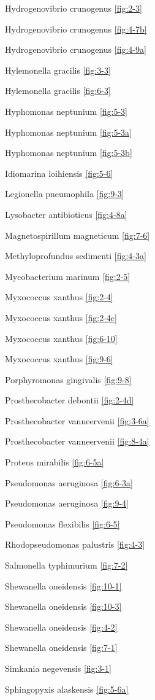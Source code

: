 \documentclass[]{tufte-book}
\begin{document}
Hydrogenovibrio crunogenus \ref{fig:2-3}

Hydrogenovibrio crunogenus \ref{fig:4-7b}

Hydrogenovibrio crunogenus \ref{fig:4-9a}

Hylemonella gracilis \ref{fig:3-3}

Hylemonella gracilis \ref{fig:6-3}

Hyphomonas neptunium \ref{fig:5-3}

Hyphomonas neptunium \ref{fig:5-3a}

Hyphomonas neptunium \ref{fig:5-3b}

Idiomarina loihiensis \ref{fig:5-6}

Legionella pneumophila \ref{fig:9-3}

Lysobacter antibioticus \ref{fig:4-8a}

Magnetospirillum magneticum \ref{fig:7-6}

Methyloprofundus sedimenti \ref{fig:4-3a}

Mycobacterium marinum \ref{fig:2-5}

Myxococcus xanthus \ref{fig:2-4}

Myxococcus xanthus \ref{fig:2-4c}

Myxococcus xanthus \ref{fig:6-10}

Myxococcus xanthus \ref{fig:9-6}

Porphyromonas gingivalis \ref{fig:9-8}

Prosthecobacter debontii \ref{fig:2-4d}

Prosthecobacter vanneervenii \ref{fig:3-6a}

Prosthecobacter vanneervenii \ref{fig:8-4a}

Proteus mirabilis \ref{fig:6-5a}

Pseudomonas aeruginosa \ref{fig:6-3a}

Pseudomonas aeruginosa \ref{fig:9-4}

Pseudomonas flexibilis \ref{fig:6-5}

Rhodopseudomonas palustris \ref{fig:4-3}

Salmonella typhimurium \ref{fig:7-2}

Shewanella oneidensis \ref{fig:10-1}

Shewanella oneidensis \ref{fig:10-3}

Shewanella oneidensis \ref{fig:4-2}

Shewanella oneidensis \ref{fig:7-1}

Simkania negevensis \ref{fig:3-1}

Sphingopyxis alaskensis \ref{fig:5-6a}
\end{document}
